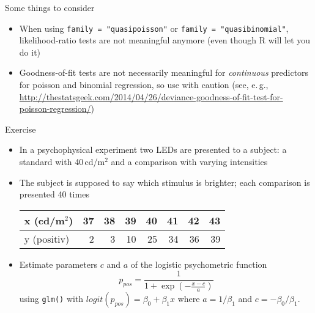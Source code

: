 \documentclass{beamer}
\begin{document}
\begin{frame}{Some things to consider}
  \begin{itemize}
    \item When using \texttt{family = "quasipoisson"} or \texttt{family =
      "quasibinomial"}, likelihood-ratio tests are not meaningful anymore
      (even though R will let you do it)
    \item Goodness-of-fit tests are not necessarily meaningful for
      \emph{continuous} predictors for poisson and binomial regression, so
      use with caution
      (see, e.\,g.,
      \url{http://thestatsgeek.com/2014/04/26/deviance-goodness-of-fit-test-for-poisson-regression/})
  \end{itemize}
\end{frame}

\begin{frame}[fragile]{}
  \begin{block}{Exercise}
    \begin{itemize}
\item In a psychophysical experiment two LEDs are presented to a
  subject: a standard with 40\,cd/m$^2$ and a comparison with varying
        intensities
    \item The subject is supposed to say which stimulus is
      brighter; each comparison is presented 40 times
        \vspace{.2cm}
\begin{center}
\begin{tabular}{l|rrrrrrr}
x (cd/m$^2$)  & 37 & 38 & 39 & 40 & 41 & 42 & 43 \\ \hline
y (positiv)   &  2 &  3 & 10 & 25 & 34 & 36 & 39
\end{tabular}
\end{center}
        \vspace{.2cm}
\item Estimate parameters $c$ and $a$ of the logistic psychometric function
\[
  p_{pos} = \frac{1}{1 +
    \exp(-\frac{\displaystyle x - c}{\displaystyle a})}
\]
using \texttt{glm()} with $logit(p_{pos}) = \beta_0 + \beta_1x$ where 
        $a = 1/\beta_1$ and $c = -\beta_0/\beta_1$.
    \end{itemize}
  \end{block}
\end{frame}
\end{document}
